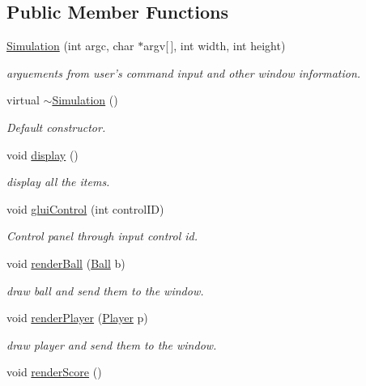 \subsection*{Public Member Functions}
\begin{DoxyCompactItemize}
\item 
\hyperlink{classSimulation_a4c669ceaa34c7130966ce45f9de75fbe}{Simulation} (int argc, char $\ast$argv\mbox{[}$\,$\mbox{]}, int width, int height)
\begin{DoxyCompactList}\small\item\em arguements from user's command input and other window information. \end{DoxyCompactList}\item 
\hypertarget{classSimulation_a80fad3f57dfaf195a36f7bc49bc88279}{virtual \hyperlink{classSimulation_a80fad3f57dfaf195a36f7bc49bc88279}{$\sim$\+Simulation} ()}\label{classSimulation_a80fad3f57dfaf195a36f7bc49bc88279}

\begin{DoxyCompactList}\small\item\em Default constructor. \end{DoxyCompactList}\item 
\hypertarget{classSimulation_a449dcb7d97dfba99efe770de2f399c31}{void \hyperlink{classSimulation_a449dcb7d97dfba99efe770de2f399c31}{display} ()}\label{classSimulation_a449dcb7d97dfba99efe770de2f399c31}

\begin{DoxyCompactList}\small\item\em display all the items. \end{DoxyCompactList}\item 
void \hyperlink{classSimulation_a1607cd18e552ab9f4a6f57d362f7121a}{glui\+Control} (int control\+I\+D)
\begin{DoxyCompactList}\small\item\em Control panel through input control id. \end{DoxyCompactList}\item 
void \hyperlink{classSimulation_aa60852eabb776ee691767c4e1e785199}{render\+Ball} (\hyperlink{classBall}{Ball} b)
\begin{DoxyCompactList}\small\item\em draw ball and send them to the window. \end{DoxyCompactList}\item 
void \hyperlink{classSimulation_a1f1da2f39bb1a8c4a5f91646e59d2480}{render\+Player} (\hyperlink{classPlayer}{Player} p)
\begin{DoxyCompactList}\small\item\em draw player and send them to the window. \end{DoxyCompactList}\item 
\hypertarget{classSimulation_a018e40e2fb25694123c4fc9999a44b64}{void \hyperlink{classSimulation_a018e40e2fb25694123c4fc9999a44b64}{render\+Score} ()}\label{classSimulation_a018e40e2fb25694123c4fc9999a44b64}


\end{DoxyCompactItemize}
